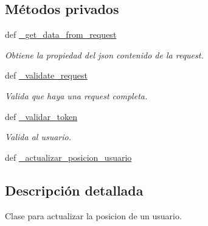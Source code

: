\subsection*{Métodos privados}
\begin{DoxyCompactItemize}
\item 
def \hyperlink{classsrc_1_1resources_1_1usuario_modificar_posicion_1_1_usuario_modificar_posicion_aae13c7944d856a343f6125fd2e4421c4}{\-\_\-get\-\_\-data\-\_\-from\-\_\-request}
\begin{DoxyCompactList}\small\item\em Obtiene la propiedad del json contenido de la request. \end{DoxyCompactList}\item 
def \hyperlink{classsrc_1_1resources_1_1usuario_modificar_posicion_1_1_usuario_modificar_posicion_a54d77c4941b97883c98d55b1cddc5930}{\-\_\-validate\-\_\-request}
\begin{DoxyCompactList}\small\item\em Valida que haya una request completa. \end{DoxyCompactList}\item 
def \hyperlink{classsrc_1_1resources_1_1usuario_modificar_posicion_1_1_usuario_modificar_posicion_a4e9232f8e1f36581c5bac7a79c825f76}{\-\_\-validar\-\_\-token}
\begin{DoxyCompactList}\small\item\em Valida al usuario. \end{DoxyCompactList}\item 
def \hyperlink{classsrc_1_1resources_1_1usuario_modificar_posicion_1_1_usuario_modificar_posicion_ae6aa1e259bed2ae4e47f89c3ee86a28d}{\-\_\-actualizar\-\_\-posicion\-\_\-usuario}
\end{DoxyCompactItemize}


\subsection{Descripción detallada}
Clase para actualizar la posicion de un usuario. 



